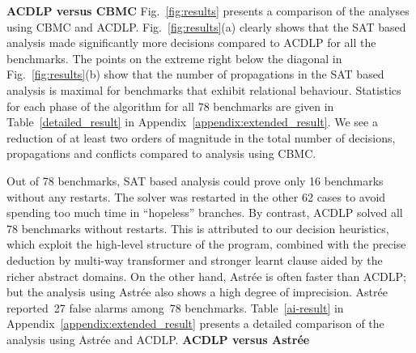 
%

%
\textbf{ACDLP versus CBMC}
Fig.~\ref{fig:results} presents a comparison of the analyses using CBMC
and ACDLP.  Fig.~\ref{fig:results}(a) clearly shows that the SAT based analysis 
made significantly more decisions compared to ACDLP for all the benchmarks. 
The points on the extreme right below the diagonal in
Fig.~\ref{fig:results}(b) show that the number of propagations in the SAT based 
analysis is maximal for benchmarks that exhibit relational behaviour. 
Statistics for each phase of the algorithm for all 78 benchmarks are 
given in Table~\ref{detailed_result} in Appendix~\ref{appendix:extended_result}.  
We see a reduction of at least two orders of magnitude in the total number 
of decisions, propagations and conflicts compared to analysis using CBMC.  

Out of 78 benchmarks, SAT based analysis could prove only 16
benchmarks without any restarts.  The solver was restarted in the other 62 cases to
avoid spending too much time in ``hopeless'' branches.  By contrast, 
ACDLP solved all 78 benchmarks without restarts.  This is
attributed to our decision heuristics, which exploit the high-level
structure of the program, combined with the precise deduction by multi-way 
transformer and stronger learnt clause aided by the richer abstract domains.  
On the other hand, Astr{\'e}e is often faster than ACDLP; but the analysis using
Astr{\'e}e also shows a high degree of imprecision.  Astr{\'e}e reported~27 false
alarms among~78 benchmarks. Table~\ref{ai-result} in 
Appendix~\ref{appendix:extended_result} presents a detailed comparison of the analysis
using Astr{\'e}e and ACDLP.
%
\textbf{ACDLP versus Astr{\'e}e} 
